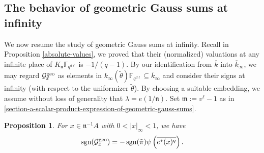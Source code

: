 \documentclass[11pt]{amsart}
\theoremstyle{plain}
\newtheorem{prop}[thm]{Proposition}
\theoremstyle{definition}
\theoremstyle{remark}
\numberwithin{equation}{section}
\newcommand{\FF}{\mathbb{F}}
\newcommand{\mfk}{\mathfrak{m}}
\newcommand{\nfk}{\mathfrak{n}}
\newcommand{\Gcal}{\mathcal{G}}
\newcommand{\sgn}{\operatorname{sgn}}
\newcommand{\ovl}{\overline}
\newcommand{\td}{\tilde}
\newcommand{\sbe}{\subseteq}
\newcommand{\Fqdl}{\FF_{q^{d\l}}}
\newcommand{\T}{\theta}
\newcommand{\bggs}{\Gcal^{\textnormal{geo}}}
\let\l\ell
\begin{document}
	\subsection{The behavior of geometric Gauss sums at infinity}    \label{section-behavior-of-geometric-gauss-sums-at-infinity}
	
	We now resume the study of geometric Gauss sums at infinity.
	Recall in Proposition \ref{absolute-values}, we proved that their (normalized) valuations at any infinite place of $K_\nfk\Fqdl$ is $-1/(q-1)$.
	By our identification from $\ovl{k}$ into $\ovl{k}_\infty$, we may regard $\bggs_x$ as elements in $k_\infty(\td{\T})\Fqdl \sbe \ovl{k}_\infty$ and consider their signs at infinity (with respect to the uniformizer $\td{\T}$).
	By choosing a suitable embedding, we assume without loss of generality that $\lambda = e(1/\nfk)$.
	Set $\mfk := v^\l-1$ as in \ref{section-a-scalar-product-expression-of-geometric-gauss-sums}.
	
	\begin{prop}   \label{sign}
		For $x \in \nfk^{-1}A$ with $0 < |x|_\infty < 1$, we have
		$$
		\sgn(\bggs_x) = -\sgn(\td{\pi}) \psi\left( \ovl{e^*(x)^q} \right).
		$$
	\end{prop}
	
\end{document}
